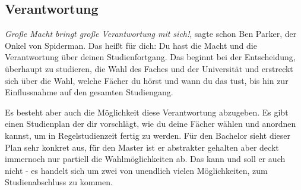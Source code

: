 \subsection{Verantwortung}
	\textit{Große Macht bringt große Verantwortung mit sich!}, sagte schon Ben Parker, der Onkel von Spiderman. Das heißt für dich: Du hast die Macht und die Verantwortung über deinen Studienfortgang. Das beginnt bei der Entscheidung, überhaupt zu studieren, die Wahl des Faches und der Universität und erstreckt sich über die Wahl, welche Fächer du hörst und wann du das tust, bis hin zur Einflussnahme auf den gesamten Studiengang.

	Es besteht aber auch die Möglichkeit diese Verantwortung abzugeben. Es gibt einen Studienplan der dir vorschlägt, wie du deine Fächer wählen und anordnen kannst, um in Regelstudienzeit fertig zu werden. Für den Bachelor sieht dieser Plan sehr konkret aus, für den Master ist er abstrakter gehalten aber deckt immernoch nur partiell die Wahlmöglichkeiten ab. Das kann und soll er auch nicht - es handelt sich um zwei von unendlich vielen Möglichkeiten, zum Studienabschluss zu kommen.